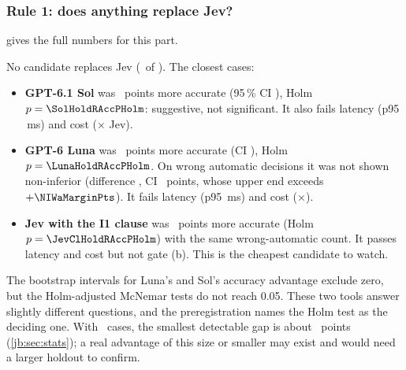 \subsubsection{Rule 1: does anything replace Jev?}\label{jb:sec:rule1}

 gives the full numbers for this part.

\begin{table}[tbp]
\centering\small
\caption{Rule 1 on the holdout \prereg: each candidate minus Jev, with paired-bootstrap 95\,\% CIs and
Holm-adjusted exact McNemar $p$ over the \RuleOneFamilyHold\ candidates. Bold Holm $p \le 0.05$. Gates as
in \cref{jb:tab:rule1-dev}; all candidates also met gate (e), valid answers.}
\label{jb:tab:rule1-hold}

\end{table}

No candidate replaces Jev (\NumReplacesHold\ of \RuleOneFamilyHold). The closest cases:
\begin{itemize}
  \item \textbf{GPT-6.1 Sol} was \SolHoldRAccDiff\ points more accurate (95\,\% CI \SolHoldRAccDiffCI),
    Holm $p = \SolHoldRAccPHolm$: suggestive, not significant. It also fails latency (p95
    \SolHoldPninetyfive\,ms) and cost (\SolHoldCostX$\times$ Jev).
  \item \textbf{GPT-6 Luna} was \LunaHoldRAccDiff\ points more accurate (CI \LunaHoldRAccDiffCI), Holm
    $p = \LunaHoldRAccPHolm$. On wrong automatic decisions it was not shown non-inferior (difference
    \LunaHoldRWaDiff, CI \LunaHoldRWaDiffCI\ points, whose upper end exceeds $+\NIWaMarginPts$). It fails
    latency (p95 \LunaHoldPninetyfive\,ms) and cost (\LunaHoldCostX$\times$).
  \item \textbf{Jev with the I1 clause} was \JevClHoldRAccDiff\ points more accurate (Holm $p =
    \JevClHoldRAccPHolm$) with the same wrong-automatic count. It passes latency and cost but not gate
    (b). This is the cheapest candidate to watch.
\end{itemize}

\begin{caution}
The bootstrap intervals for Luna's and Sol's accuracy advantage exclude zero, but the Holm-adjusted
McNemar tests do not reach 0.05. These two tools answer slightly different questions, and the
preregistration names the Holm test as the deciding one. With \HoldN\ cases, the smallest detectable gap
is about \HoldMinDetectPts\ points (\cref{jb:sec:stats}); a real advantage of this size or smaller may
exist and would need a larger holdout to confirm.
\end{caution}

